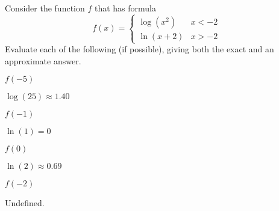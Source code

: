\begin{exercises}
\begin{problem}
Consider the function $f$ that has formula
\[
	f(x)=
	\begin{cases}
		\log(x^2) & x <-2 \\
		\ln(x+2)  & x>-2  
	\end{cases}
\]
Evaluate each of the following (if possible), giving both the exact and an approximate answer.
\begin{multicols}{4}
	\begin{subproblem}
		$f(-5)$ 
		\begin{shortsolution}
			$\log(25)\approx 1.40$ 
		\end{shortsolution}
	\end{subproblem}
	\begin{subproblem}
		$f(-1)$ 
		\begin{shortsolution}
			$\ln(1)=0$ 
		\end{shortsolution}
	\end{subproblem}
	\begin{subproblem}
		$f(0)$ 
		\begin{shortsolution}
			$\ln(2)\approx 0.69$ 
		\end{shortsolution}
	\end{subproblem}
	\begin{subproblem}
		$f(-2)$ 
		\begin{shortsolution}
			Undefined. 
		\end{shortsolution}
	\end{subproblem}
\end{multicols}
\end{problem}


\end{exercises}
